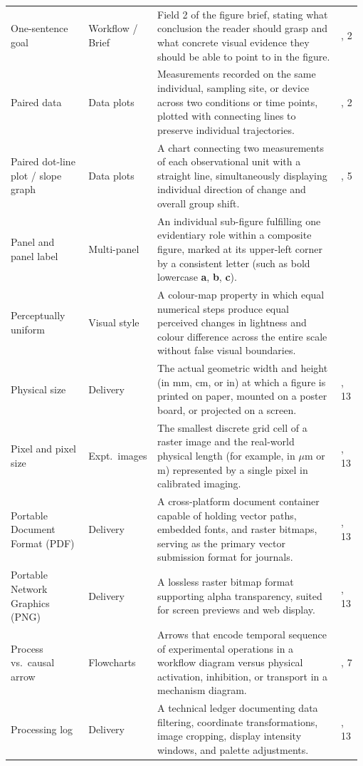 \begin{longtable}{@{}>{\raggedright\arraybackslash}p{0.22\linewidth}>{\raggedright\arraybackslash}p{0.18\linewidth}>{\raggedright\arraybackslash}p{0.52\linewidth}>{\raggedright\arraybackslash}p{0.06\linewidth}@{}}
One-sentence goal & Workflow / Brief & Field 2 of the figure brief, stating what conclusion the reader should grasp and what concrete visual evidence they should be able to point to in the figure. & 1, 2 \\
Paired data & Data plots & Measurements recorded on the same individual, sampling site, or device across two conditions or time points, plotted with connecting lines to preserve individual trajectories. & 1, 2 \\
Paired dot-line plot / slope graph & Data plots & A chart connecting two measurements of each observational unit with a straight line, simultaneously displaying individual direction of change and overall group shift. & 1, 5 \\
Panel and panel label & Multi-panel & An individual sub-figure fulfilling one evidentiary role within a composite figure, marked at its upper-left corner by a consistent letter (such as bold lowercase \textbf{a}, \textbf{b}, \textbf{c}). & 9 \\
Perceptually uniform & Visual style & A colour-map property in which equal numerical steps produce equal perceived changes in lightness and colour difference across the entire scale without false visual boundaries. & 4 \\
Physical size & Delivery & The actual geometric width and height (in mm, cm, or in) at which a figure is printed on paper, mounted on a poster board, or projected on a screen. & 12, 13 \\
Pixel and pixel size & Expt.\ images & The smallest discrete grid cell of a raster image and the real-world physical length (for example, in $\mu\text{m}$ or m) represented by a single pixel in calibrated imaging. & 8, 13 \\
Portable Document Format (PDF) & Delivery & A cross-platform document container capable of holding vector paths, embedded fonts, and raster bitmaps, serving as the primary vector submission format for journals. & 1, 13 \\
Portable Network Graphics (PNG) & Delivery & A lossless raster bitmap format supporting alpha transparency, suited for screen previews and web display. & 1, 13 \\
Process vs.\ causal arrow & Flowcharts & Arrows that encode temporal sequence of experimental operations in a workflow diagram versus physical activation, inhibition, or transport in a mechanism diagram. & 6, 7 \\
Processing log & Delivery & A technical ledger documenting data filtering, coordinate transformations, image cropping, display intensity windows, and palette adjustments. & 8, 13 \\

\end{longtable}
